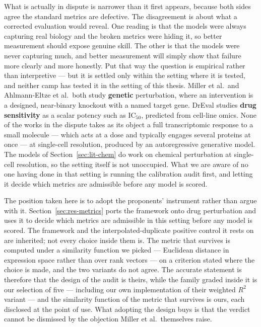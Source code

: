 What is actually in dispute is narrower than it first appears, because both sides agree the standard
metrics are defective. The disagreement is about what a corrected evaluation would reveal. One
reading is that the models were always capturing real biology and the broken metrics were hiding it,
so better measurement should expose genuine skill. The other is that the models were never capturing
much, and better measurement will simply show that failure more clearly and more honestly. Put that
way the question is empirical rather than interpretive --- but it is settled only within the setting
where it is tested, and neither camp has tested it in the setting of this thesis. Miller et al.\
and Ahlmann-Eltze et al.\ both study \textbf{genetic} perturbation, where an intervention is a
designed, near-binary knockout with a named target gene. DrEval studies \textbf{drug sensitivity} as
a scalar potency such as IC$_{50}$, predicted from cell-line omics. None of the works in the dispute
takes as its object a full transcriptomic response to a small molecule --- which acts at a dose and
typically engages several proteins at once --- at single-cell resolution, produced by an
autoregressive generative model. The models of Section~\ref{sec:lit-chem} do work on chemical
perturbation at single-cell resolution, so the setting itself is not unoccupied. What we are aware
of no one having done in that setting is running the calibration audit first, and letting it decide
which metrics are admissible before any model is scored.

The position taken here is to adopt the proponents' instrument rather than argue with it.
Section~\ref{sec:res-metrics} ports the \DRF{} framework onto drug perturbation and uses it to decide
which metrics are admissible in this setting before any model is scored. The framework and the
interpolated-duplicate positive control it rests on are inherited; not every choice inside them
is. The metric that survives is computed under a similarity
function we picked --- Euclidean distance in expression space rather than over rank vectors --- on a
criterion stated where the choice is made, and the two variants do not agree. The accurate statement
is therefore that the design of the audit is theirs, while the family graded inside it is our
selection of five --- including our own implementation of their weighted $R^2$ variant --- and the
similarity function of the metric that survives is ours, each disclosed at the point of use. What adopting the design buys is that the verdict
cannot be dismissed by the objection Miller et al.\ themselves raise.

